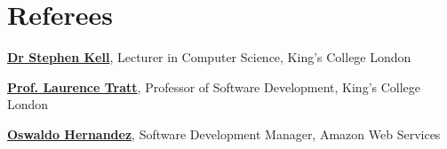 \documentclass[11pt,a4paper]{article}
\begin{document}
    
    
    
    
    
    
    
    \section{Referees}
    
    \begin{flushleft}
    \href{https://www.kcl.ac.uk/people/stephen-kell}{\textbf{Dr Stephen Kell}}, Lecturer in Computer Science, King's College London
    
    \href{https://www.kcl.ac.uk/people/laurence-tratt}{\textbf{Prof. Laurence Tratt}}, Professor of Software Development, King's College London
    
    \href{mailto:oswaldhs@amazon.co.uk}{\textbf{Oswaldo Hernandez}}, Software Development Manager, Amazon Web Services
    \end{flushleft}
    
    
\end{document}
